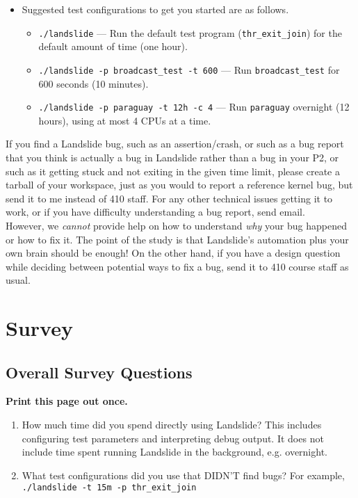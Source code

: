 \documentclass{article}
\begin{document}
\begin{enumerate}
\begin{itemize}
			\item Suggested test configurations to get you started are as follows.
			\begin{itemize}
				\item {\tt ./landslide} --- Run the default test program ({\tt thr\_exit\_join}) for the default amount of time (one hour).
				\item {\tt ./landslide -p broadcast\_test -t 600} --- Run {\tt broadcast\_test} for 600 seconds (10 minutes).
				\item {\tt ./landslide -p paraguay -t 12h -c 4} --- Run {\tt paraguay} overnight (12 hours), using at most 4 CPUs at a time.
			\end{itemize}
		\end{itemize}
\end{enumerate}

If you find a Landslide bug, such as an assertion/crash, or such as a bug report that you think is actually a bug in Landslide rather than a bug in your P2, or such as it getting stuck and not exiting in the given time limit, please create a tarball of your workspace, just as you would to report a reference kernel bug, but send it to me instead of 410 staff.
For any other technical issues getting it to work, or if you have difficulty understanding a bug report, send email.
\\

\noindent
However, we {\em cannot} provide help on how to understand {\em why} your bug happened or how to fix it. The point of the study is that Landslide's automation plus your own brain should be enough! On the other hand, if you have a design question while deciding between potential ways to fix a bug, send it to 410 course staff as usual.


\newpage

\section{Survey}
\subsection{Overall Survey Questions}

\begin{center}
{\bf Print this page out once.}
\end{center}

\begin{enumerate}
	\item How much time did you spend directly using Landslide? This includes configuring test parameters and interpreting debug output. It does not include time spent running Landslide in the background, e.g. overnight.
		\vspace{0.5in}

	\item What test configurations did you use that DIDN'T find bugs? For example, {\tt ./landslide -t 15m -p thr\_exit\_join}
\end{enumerate}
\end{document}
